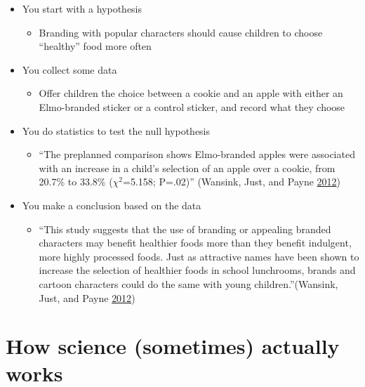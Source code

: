 \documentclass[12pt,]{book}
\providecommand{\tightlist}{%
  \setlength{\itemsep}{0pt}\setlength{\parskip}{0pt}}
\theoremstyle{definition}
\theoremstyle{definition}
\theoremstyle{definition}
\theoremstyle{remark}
\begin{document}
\begin{itemize}
\tightlist
\item
  You start with a hypothesis

  \begin{itemize}
  \tightlist
  \item
    Branding with popular characters should cause children to choose ``healthy'' food more often
  \end{itemize}
\item
  You collect some data

  \begin{itemize}
  \tightlist
  \item
    Offer children the choice between a cookie and an apple with either an Elmo-branded sticker or a control sticker, and record what they choose
  \end{itemize}
\item
  You do statistics to test the null hypothesis

  \begin{itemize}
  \tightlist
  \item
    ``The preplanned comparison shows Elmo-branded apples were associated with an increase in a child's selection of an apple over a cookie, from 20.7\% to 33.8\% (\(\chi^2\)=5.158; P=.02)'' (Wansink, Just, and Payne \protect\hyperlink{ref-wans:just:payn:2012}{2012})
  \end{itemize}
\item
  You make a conclusion based on the data

  \begin{itemize}
  \tightlist
  \item
    ``This study suggests that the use of branding or appealing branded characters may benefit healthier foods more than they benefit indulgent, more highly processed foods. Just as attractive names have been shown to increase the selection of healthier foods in school lunchrooms, brands and cartoon characters could do the same with young children.''(Wansink, Just, and Payne \protect\hyperlink{ref-wans:just:payn:2012}{2012})
  \end{itemize}
\end{itemize}

\hypertarget{how-science-sometimes-actually-works}{%
\section{How science (sometimes) actually works}\label{how-science-sometimes-actually-works}}
\end{document}
